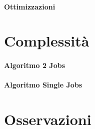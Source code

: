 \documentclass[paper=a4, fontsize=11pt]{scrartcl}	%
\numberwithin{equation}{section}															%
\numberwithin{figure}{section}																%
\numberwithin{table}{section}																%
\begin{document}
\paragraph{Ottimizzazioni}


\section{Complessit\`a}
\paragraph{Algoritmo 2 Jobs}
\paragraph{Algoritmo Single Jobs}


\section{Osservazioni}
\end{document}
